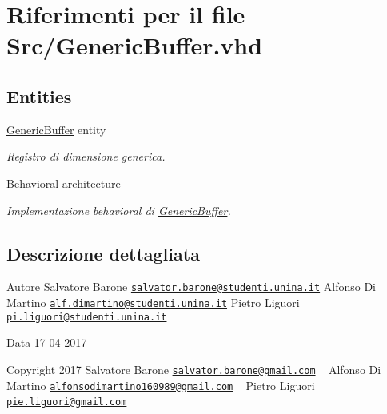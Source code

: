 \hypertarget{_generic_buffer_8vhd}{}\section{Riferimenti per il file Src/\+Generic\+Buffer.vhd}
\label{_generic_buffer_8vhd}
\subsection*{Entities}
\begin{DoxyCompactItemize}
\item 
\hyperlink{class_generic_buffer}{Generic\+Buffer} entity
\begin{DoxyCompactList}\small\item\em Registro di dimensione generica. \end{DoxyCompactList}\item 
\hyperlink{class_generic_buffer_1_1_behavioral}{Behavioral} architecture
\begin{DoxyCompactList}\small\item\em Implementazione behavioral di \hyperlink{class_generic_buffer}{Generic\+Buffer}. \end{DoxyCompactList}\end{DoxyCompactItemize}


\subsection{Descrizione dettagliata}
\begin{DoxyAuthor}{Autore}
Salvatore Barone \href{mailto:salvator.barone@studenti.unina.it}{\tt salvator.\+barone@studenti.\+unina.\+it} Alfonso Di Martino \href{mailto:alf.dimartino@studenti.unina.it}{\tt alf.\+dimartino@studenti.\+unina.\+it} Pietro Liguori \href{mailto:pi.liguori@studenti.unina.it}{\tt pi.\+liguori@studenti.\+unina.\+it} 
\end{DoxyAuthor}
\begin{DoxyDate}{Data}
17-\/04-\/2017
\end{DoxyDate}
Copyright 2017 Salvatore Barone \href{mailto:salvator.barone@gmail.com}{\tt salvator.\+barone@gmail.\+com} ~\newline
 Alfonso Di Martino \href{mailto:alfonsodimartino160989@gmail.com}{\tt alfonsodimartino160989@gmail.\+com} ~\newline
 Pietro Liguori \href{mailto:pie.liguori@gmail.com}{\tt pie.\+liguori@gmail.\+com} ~\newline


